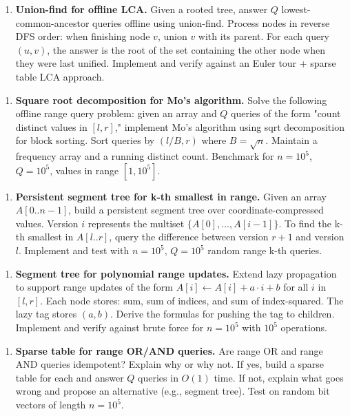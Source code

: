 \begin{enumerate}
\item \textbf{Union-find for offline LCA.} Given a rooted tree, answer $Q$ lowest-common-ancestor queries offline using union-find. Process nodes in reverse DFS order: when finishing node $v$, union $v$ with its parent. For each query $(u, v)$, the answer is the root of the set containing the other node when they were last unified. Implement and verify against an Euler tour + sparse table LCA approach.
\end{enumerate}

\begin{enumerate}
\item \textbf{Square root decomposition for Mo's algorithm.} Solve the following offline range query problem: given an array and $Q$ queries of the form "count distinct values in $[l, r]$," implement Mo's algorithm using sqrt decomposition for block sorting. Sort queries by $(l / B, r)$ where $B = \sqrt{n}$. Maintain a frequency array and a running distinct count. Benchmark for $n = 10^{5}$, $Q = 10^{5}$, values in range $[1, 10^{5}]$.
\end{enumerate}

\begin{enumerate}
\item \textbf{Persistent segment tree for k-th smallest in range.} Given an array $A[0..n-1]$, build a persistent segment tree over coordinate-compressed values. Version $i$ represents the multiset $\{A[0], \ldots, A[i-1]\}$. To find the k-th smallest in $A[l..r]$, query the difference between version $r+1$ and version $l$. Implement and test with $n = 10^{5}$, $Q = 10^{5}$ random range k-th queries.
\end{enumerate}

\begin{enumerate}
\item \textbf{Segment tree for polynomial range updates.} Extend lazy propagation to support range updates of the form $A[i] \leftarrow A[i] + a \cdot i + b$ for all $i$ in $[l, r]$. Each node stores: sum, sum of indices, and sum of index-squared. The lazy tag stores $(a, b)$. Derive the formulas for pushing the tag to children. Implement and verify against brute force for $n = 10^{5}$ with $10^{5}$ operations.
\end{enumerate}

\begin{enumerate}
\item \textbf{Sparse table for range OR/AND queries.} Are range OR and range AND queries idempotent? Explain why or why not. If yes, build a sparse table for each and answer $Q$ queries in $O(1)$ time. If not, explain what goes wrong and propose an alternative (e.g., segment tree). Test on random bit vectors of length $n = 10^{5}$.
\end{enumerate}

